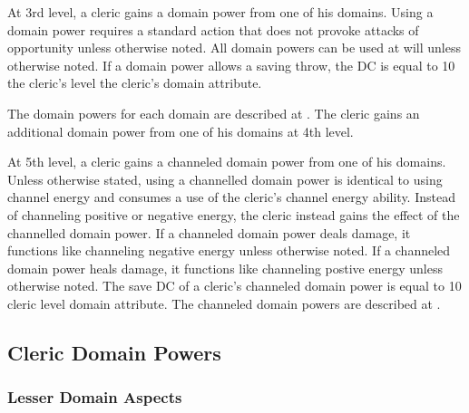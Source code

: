  At 3rd level, a cleric gains a domain power from one of his domains. Using a domain power requires a standard action that does not provoke attacks of opportunity unless otherwise noted. All domain powers can be used at will unless otherwise noted. If a domain power allows a saving throw, the DC is equal to 10 \add the cleric's level \add the cleric's domain attribute.

The domain powers for each domain are described at . The cleric gains an additional domain power from one of his domains at 4th level.

 At 5th level, a cleric gains a channeled domain power from one of his domains. Unless otherwise stated, using a channelled domain power is identical to using channel energy and consumes a use of the cleric's channel energy ability. Instead of channeling positive or negative energy, the cleric instead gains the effect of the channelled domain power. If a channeled domain power deals damage, it functions like channeling negative energy unless otherwise noted. If a channeled domain power heals damage, it functions like channeling postive energy unless otherwise noted. The save DC of a cleric's channeled domain power is equal to 10 \add cleric level \add domain attribute. The channeled domain powers are described at .

\subsection{Cleric Domain Powers}

\subsubsection{Lesser Domain Aspects}\label{Lesser Domain Aspects}

